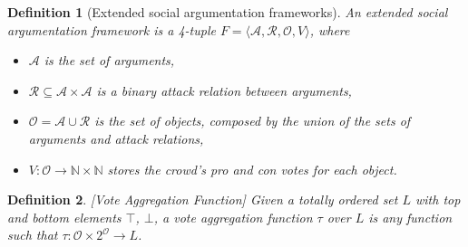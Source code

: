 \documentclass{article}
\date{ }
\newtheorem{definition}{Definition}
\newcommand{\nat}{\mathbb{N}}   %
\newcommand{\args}{\mathcal{A}} %
\newcommand{\att}{\mathcal{R}}  %
\newcommand{\valueset}{L}
\newcommand{\obj}{\mathcal{O}} %
\newcommand{\safid}{F}               %
\newcommand{\safbodyO}{\langle \args, \att, \obj, V \rangle} %
\newcommand{\safO}{\safid = \safbodyO} %
\begin{document}



\begin{definition}[Extended social argumentation frameworks]
An \emph{extended social argumentation framework} is a 4-tuple $\safO$, where
\begin{itemize}
  \item $\args$ is the set of arguments,
  \item $\att \subseteq \args \times \args$ is a binary attack relation between arguments,
  \item $\obj = \args \cup \att$ is the set of objects, composed by the union of the sets of arguments and attack relations,
  \item $V : \obj \to \nat \times \nat$ stores the crowd's pro and con votes for each object.
\end{itemize}
\end{definition}

\begin{definition}
\label{def:voteAgg}
[Vote Aggregation Function]
Given a totally ordered set $\valueset$ with top and bottom elements $\top$, $\bot$, a vote aggregation function $\tau$ over $\valueset$ is any function such that $\tau: \obj  \times {2}^{\obj} \to L$.
\end{definition}
\end{document}
